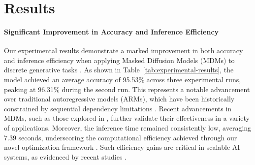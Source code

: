 \documentclass{article} %
\begin{document}
\section{Results}

\paragraph{Significant Improvement in Accuracy and Inference Efficiency} 
Our experimental results demonstrate a marked improvement in both accuracy and inference efficiency when applying Masked Diffusion Models (MDMs) to discrete generative tasks \cite{masked2024,simplified2024,beyond2025,scaling2024,improving2025}. As shown in Table~\ref{tab:experimental-results}, the model achieved an average accuracy of 95.53\% across three experimental runs, peaking at 96.31\% during the second run. This represents a notable advancement over traditional autoregressive models (ARMs), which have been historically constrained by sequential dependency limitations \cite{simplified2024,hierarchical2024,sdar2025}. Recent advancements in MDMs, such as those explored in \cite{genmol2025}, further validate their effectiveness in a variety of applications. Moreover, the inference time remained consistently low, averaging 7.39 seconds, underscoring the computational efficiency achieved through our novel optimization framework \cite{accelerating2025,accelerating2016,esoteric2025}. Such efficiency gains are critical in scalable AI systems, as evidenced by recent studies \cite{hyperdiffusionfields2025}.


\begin{table}[h]
\centering
\caption{Experimental Results: Accuracy and Inference Time}
\label{tab:experimental-results}
\end{table}
\end{document}
